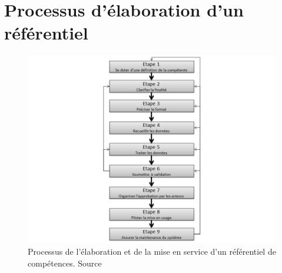 \chapter{Processus d'élaboration d'un référentiel}

\begin{figure}[h!]
    \begin{center}
        \includegraphics[scale=0.7]{document/process.png}
        \caption{Processus de l'élaboration et de la mise en service d'un référentiel de compétences. Source \citep[pp.41]{refcompetence} }
        \label{process}
    \end{center}
\end{figure}
